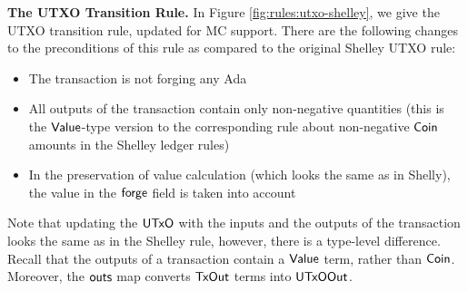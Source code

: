 \clearpage

\textbf{The UTXO Transition Rule.}
In Figure \ref{fig:rules:utxo-shelley}, we give the UTXO transition rule,
updated for MC support. There are the following changes to the preconditions
of this rule as compared to the original Shelley UTXO rule:

\begin{itemize}
  \item The transaction is not forging any Ada

  \item All outputs of the transaction contain only non-negative quantities
  (this is the $\mathsf{Value}$-type version to the corresponding rule about non-negative
  $\mathsf{Coin}$ amounts in the Shelley ledger rules)

  \item In the preservation of value calculation (which looks the same as in
  Shelly), the value in the $\mathsf{forge}$ field is taken into account
\end{itemize}

Note that updating the $\mathsf{UTxO}$ with the inputs and the outputs of the transaction
looks the same as in the Shelley rule, however, there is a type-level difference.
Recall that the outputs of a transaction contain a $\mathsf{Value}$ term, rather than
$\mathsf{Coin}$. Moreover, the $\mathsf{outs}$ map converts $\mathsf{TxOut}$ terms into $\mathsf{UTxOOut}$.


